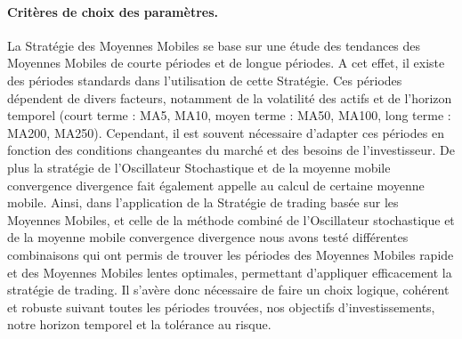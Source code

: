 \paragraph{Critères de choix des
paramètres.}\label{crituxe8res-de-choix-des-paramuxe8tres.}

La Stratégie des Moyennes Mobiles se base sur une étude des tendances
des Moyennes Mobiles de courte périodes et de longue périodes. A cet
effet, il existe des périodes standards dans l'utilisation de cette
Stratégie. Ces périodes dépendent de divers facteurs, notamment de la
volatilité des actifs et de l'horizon temporel (court terme : MA5, MA10,
moyen terme : MA50, MA100, long terme : MA200, MA250). Cependant, il est
souvent nécessaire d'adapter ces périodes en fonction des conditions
changeantes du marché et des besoins de l'investisseur. De plus la
stratégie de l'Oscillateur Stochastique et de la moyenne mobile
convergence divergence fait également appelle au calcul de certaine
moyenne mobile. Ainsi, dans l'application de la Stratégie de trading
basée sur les Moyennes Mobiles, et celle de la méthode combiné de
l'Oscillateur stochastique et de la moyenne mobile convergence
divergence nous avons testé différentes combinaisons qui ont permis de
trouver les périodes des Moyennes Mobiles rapide et des Moyennes Mobiles
lentes optimales, permettant d'appliquer efficacement la stratégie de
trading. Il s'avère donc nécessaire de faire un choix logique, cohérent
et robuste suivant toutes les périodes trouvées, nos objectifs
d'investissements, notre horizon temporel et la tolérance au risque.


